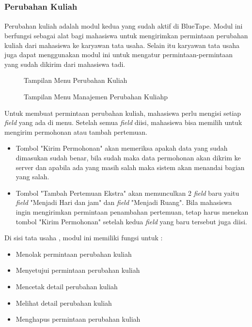 \subsubsection{Perubahan Kuliah}
\paragraph{} Perubahan kuliah adalah modul kedua yang sudah aktif di BlueTape. Modul ini berfungsi sebagai alat bagi mahasiswa untuk mengirimkan permintaan perubahan kuliah dari mahasiswa ke karyawan tata usaha. Selain itu karyawan tata usaha juga dapat menggunakan modul ini untuk mengatur permintaan-permintaan yang sudah dikirim dari mahasiswa tadi. 
\begin{figure} [H]
	\centering  
	\caption[Tampilan Menu Perubahan Kuliah]{Tampilan Menu Perubahan Kuliah} 
	\label{fig:flow-chart-CodeIgniter} 
\end{figure}
\begin{figure} [H]
	\centering  
	\caption[Tampilan Menu Manajemen Perubahan Kuliah]{Tampilan Menu Manajemen Perubahan Kuliahp} 
	\label{fig:flow-chart-CodeIgniter} 
\end{figure}
Untuk membuat permintaan perubahan kuliah, mahasiswa perlu mengisi setiap \textit{field} yang ada di menu. Setelah semua \textit{field} diisi, mahasiswa bisa memilih untuk mengirim permohonan atau tambah pertemuan.
\begin{itemize}
	\item Tombol "Kirim Permohonan" akan memeriksa apakah data yang sudah dimasukan sudah benar, bila sudah maka data permohonan akan dikrim ke server dan apabila ada yang masih salah maka sistem akan menandai bagian yang salah.
	
	\item Tombol "Tambah Pertemuan Ekstra" akan memunculkan 2 \textit{field} baru yaitu \textit{field} "Menjadi Hari dan jam" dan \textit{field} "Menjadi Ruang". Bila mahasiswa ingin mengirimkan permintaan penambahan pertemuan, tetap harus menekan tombol "Kirim Permohonan" setelah kedua \textit{field} yang baru tersebut juga diisi.
\end{itemize}
Di sisi tata usaha , modul ini memiliki fungsi untuk :
\begin{itemize}
	\item Menolak permintaan perubahan kuliah
	\item Menyetujui permintaan perubahan kuliah
	\item Mencetak detail perubahan kuliah
	\item Melihat detail perubahan kuliah
	\item Menghapus permintaan perubahan kuliah
\end{itemize}
  
